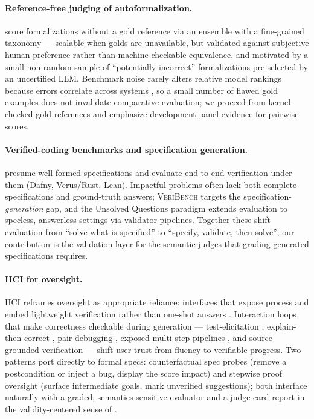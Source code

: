 \documentclass{article}
\begin{document}
\paragraph{Reference-free judging of autoformalization.}
\citet{zhang2025goldstandardsepistemicensemble} score formalizations without a gold reference via an ensemble with a fine-grained taxonomy --- scalable when golds are unavailable, but validated against subjective human preference rather than machine-checkable equivalence, and motivated by a small non-random sample of ``potentially incorrect'' formalizations pre-selected by an uncertified LLM.
Benchmark noise rarely alters relative model rankings because errors correlate across systems \citep{salaudeen2024imagenot}, so a small number of flawed gold examples does not invalidate comparative evaluation; we proceed from kernel-checked gold references and emphasize development-panel evidence for pairwise scores.

\paragraph{Verified-coding benchmarks and specification generation.}
\citet{bursuc2025benchmarkvericodingformallyverified} presume well-formed specifications and evaluate end-to-end verification under them (Dafny, Verus/Rust, Lean).
Impactful problems often lack both complete specifications and ground-truth answers; \textsc{VeriBench} targets the specification-\emph{generation} gap, and the Unsolved Questions paradigm \citep{nie2025uqassessinglanguagemodels} extends evaluation to specless, answerless settings via validator pipelines.
Together these shift evaluation from ``solve what is specified'' to ``specify, validate, then solve''; our contribution is the validation layer for the semantic judges that grading generated specifications requires.

\paragraph{HCI for oversight.}
HCI reframes oversight as appropriate reliance: interfaces that expose process and embed lightweight verification rather than one-shot answers \citep{bach2022trusthci,ding2025citations,wang2024trustcode}.
Interaction loops that make correctness checkable during generation --- test-elicitation \citep{naik2024ticoder}, explain-then-correct \citep{yan2024intelliexplain}, pair debugging \citep{ma2024hypocompass}, exposed multi-step pipelines \citep{wu2022promptchainer}, and source-grounded verification \citep{shen2024symgen} --- shift user trust from fluency to verifiable progress.
Two patterns port directly to formal specs: counterfactual spec probes (remove a postcondition or inject a bug, display the score impact) and stepwise proof oversight (surface intermediate goals, mark unverified suggestions); both interface naturally with a graded, semantics-sensitive evaluator and a judge-card report in the validity-centered sense of \citet{salaudeen2025measurement}.
\end{document}
